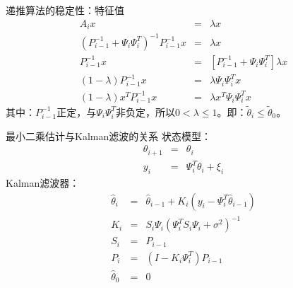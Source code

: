 \begin{frame}{递推算法的稳定性：特征值}
\begin{eqnarray*}
A_i x &=& \lambda x \\
(P_{i-1}^{-1}+\Psi_i\Psi_i^T)^{-1} P_{i-1}^{-1}x &=& \lambda x \\
P_{i-1}^{-1}x &=& [P_{i-1}^{-1}+\Psi_i\Psi_i^T]\lambda x \\
(1-\lambda)P_{i-1}^{-1}x &=& \lambda \Psi_i\Psi_i^T x \\
(1-\lambda) x^T P_{i-1}^{-1}x &=& \lambda x^T \Psi_i\Psi_i^T x 
\end{eqnarray*}
其中：$ P_{i-1}^{-1} $正定，与$\Psi_i\Psi_i^T$非负定，所以$0<\lambda \leq 1$。即：$\tilde\theta_i\leq\tilde\theta_0$。
\end{frame}

\begin{frame}{最小二乘估计与Kalman滤波的关系}
状态模型：
\begin{eqnarray*}
\theta_{i+1} &=& \theta_i \\
y_i &=& \Psi_i^T\theta_i +\xi_i
\end{eqnarray*}
Kalman滤波器：
\begin{eqnarray*}
\hat\theta_i &=& \hat\theta_{i-1} +K_i(y_i-\Psi_i^T\hat\theta_{i-1})  \\
K_i &=& S_i\Psi_i(\Psi_i^T S_i\Psi_i+\sigma^2)^{-1}  \\
S_i &=&  P_{i-1} \\
P_i &=&   (I-K_i\Psi_i^T)P_{i-1} \\
\hat\theta_0 &=& 0 \\
\end{eqnarray*}
\end{frame}


